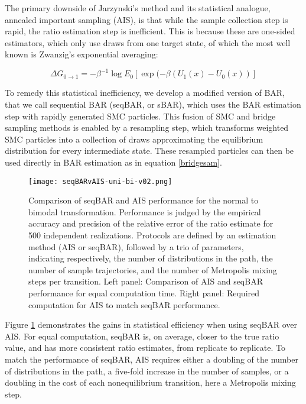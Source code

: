 The primary downside of Jarzynski's method and its statistical analogue, annealed important sampling\cite{neal2001annealed} (AIS), is that while the sample collection step is rapid, the ratio estimation step is inefficient. 
This is because these are one-sided estimators, which only use draws from one target state, of which the most well known is Zwanzig's exponential averaging\cite{zwanzig1954high}:

\begin{equation}
    \Delta G_{0 \rightarrow 1} = -\beta^{-1} \log E_0[\exp(-\beta(U_1(x)-U_0(x))]
\end{equation}

To remedy this statistical inefficiency, we develop a modified version of BAR, that we call sequential BAR (seqBAR, or sBAR), which uses the BAR estimation step with rapidly generated SMC particles.
This fusion of SMC and bridge sampling methods is enabled by a resampling step\cite{murray2012gpu}, which transforms weighted SMC particles into a collection of draws approximating the equilibrium distribution for every intermediate state.
These resampled particles can then be used directly in BAR estimation as in equation \eqref{bridgesam}. 

\begin{figure}
    \centering
    \texttt{[image: seqBARvAIS-uni-bi-v02.png]}
    \caption[Comparison of seqBAR and AIS performance for the normal to bimodal transformation]{Comparison of seqBAR and AIS performance for the normal to bimodal transformation. Performance is judged by the empirical accuracy and precision of the relative error of the ratio estimate for 500 independent realizations. Protocols are defined by an estimation method (AIS or seqBAR), followed by a trio of parameters, indicating respectively, the number of distributions in the path, the number of sample trajectories, and the number of Metropolis mixing steps per transition. Left panel: Comparison of AIS and seqBAR performance for equal computation time. Right panel: Required computation for AIS to match seqBAR performance.}
    \label{fig:sBARvAIS}
\end{figure}

Figure \ref{fig:sBARvAIS} demonstrates the gains in statistical efficiency when using seqBAR over AIS. 
For equal computation, seqBAR is, on average, closer to the true ratio value, and has more consistent ratio estimates, from replicate to replicate. 
To match the performance of seqBAR, AIS requires either a doubling of the number of distributions in the path, a five-fold increase in the number of samples, or a doubling in the cost of each nonequilibrium transition, here a Metropolis\cite{metropolis1953equation} mixing step.

